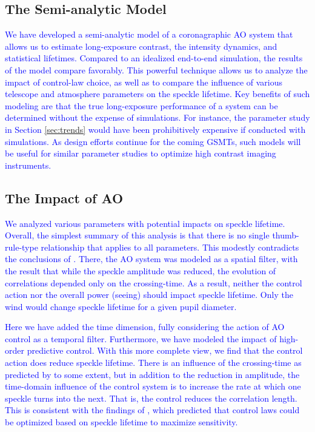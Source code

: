 \documentclass[10pt,preprint]{aastex631}
\newcommand{\jrmadd}[1]{\textcolor{blue}{#1}}
\newcommand{\mpfadd}[1]{\textcolor{avocado}{#1}}
\begin{document}
\subsection{The Semi-analytic Model}

\jrmadd{We have developed a semi-analytic model of a coronagraphic AO system that allows us to estimate long-exposure contrast, the intensity dynamics, and statistical lifetimes.  Compared to an idealized end-to-end simulation, the results of the model compare favorably.  This powerful technique allows us to analyze the impact of control-law choice, as well as to compare the influence of various telescope and atmosphere parameters on the speckle lifetime.  Key benefits of such modeling are that the true long-exposure performance of a system can be determined without the expense of simulations.  For instance, the parameter study in Section \ref{sec:trends} would have been prohibitively expensive if conducted with simulations. As design efforts continue for the coming GSMTs, such models will be useful for similar parameter studies to optimize high contrast imaging instruments.}

\subsection{The Impact of AO}

\jrmadd{We analyzed various parameters with potential impacts on speckle lifetime.  Overall, the simplest summary of this analysis is that there is no single thumb-rule-type relationship that applies to all parameters.  This modestly contradicts the conclusions of \citet{2005SPIE.5903..170M}.  There, the AO system was modeled as a spatial filter, with the result that while the speckle amplitude was reduced, the evolution of correlations depended only on the crossing-time.  As a result, neither the control action nor the overall power (seeing) should impact speckle lifetime.  Only the wind would change speckle lifetime for a given \mpfadd{pupil} diameter.}

\jrmadd{Here we have added the time dimension, fully considering the action of AO control as a temporal filter.  Furthermore, we have modeled the impact of high-order predictive control.  With this more complete view, we find that the control action does reduce speckle lifetime.  There is an influence of the crossing-time as predicted by \citet{2005SPIE.5903..170M} to some extent, but in addition to the reduction in amplitude, the time-domain influence of the control system is to increase the rate at which one speckle turns into the next.  That is, the control reduces the correlation length.  This is consistent with the findings of \citet{2006OExpr..14.7499P}, which predicted that control laws could be optimized based on speckle lifetime to maximize sensitivity.}
\end{document}
